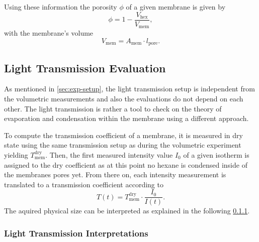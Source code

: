 \documentclass[../thesis.tex]{subfiles}
\begin{document}
            Using these information the porosity $\phi$ of a given membrane is given by
            \begin{equation}
                \phi = 1 - \frac{V_\mathrm{hex}}{V_\mathrm{mem}} ,
                \label{eq:porosity}
            \end{equation}
            with the membrane's volume
            \begin{equation*}
                V_\mathrm{mem} = A_\mathrm{mem} \cdot l_\mathrm{pore}.
            \end{equation*}


        \subsection{Light Transmission Evaluation}
        \label{subsec:light-transmission-evaluation}

            As mentioned in \cref{sec:exp-setup}, the light transmission setup is independent from the volumetric measurements and also the evaluations do not depend on each other. The light transmission is rather a tool to check on the theory of evaporation and condensation within the membrane using a different approach.
            \medskip

            To compute the transmission coefficient of a membrane, it is measured in dry state using the same transmission setup as during the volumetric experiment yielding $T_\mathrm{mem}^\mathrm{dry}$. Then, the first measured intensity value $I_0$ of a given isotherm is assigned to the dry coefficient as at this point no hexane is condensed inside of the membranes pores yet. From there on, each intensity measurement is translated to a transmission coefficient according to
            \begin{equation}
                T(t) = T_\mathrm{mem}^\mathrm{dry} \cdot \frac{I_0}{I(t)}.
            \end{equation}
            The aquired physical size can be interpreted as explained in the following  \cref{subsec:light-transmission-interpretation}.


            \subsubsection{Light Transmission Interpretations}
            \label{subsec:light-transmission-interpretation}

                
\end{document}
